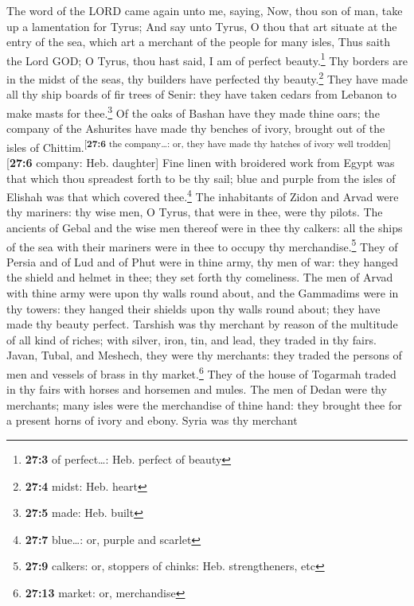 The word of the LORD came again unto me, saying,
 Now, thou son of man, take up a lamentation for Tyrus;
 And say unto Tyrus, O thou that art situate at the entry
of the sea, which art a merchant of the people for many isles, Thus
saith the Lord GOD; O Tyrus, thou hast said, I am of perfect
beauty.\footnote{\textbf{27:3} of perfect\ldots: Heb. perfect of beauty}
 Thy borders are in the midst of the seas, thy builders
have perfected thy beauty.\footnote{\textbf{27:4} midst: Heb. heart}
 They have made all thy ship boards of fir trees of Senir:
they have taken cedars from Lebanon to make masts for thee.\footnote{\textbf{27:5}
  made: Heb. built}  Of the oaks of Bashan have they made
thine oars; the company of the Ashurites have made thy benches of ivory,
brought out of the isles of Chittim.\textsuperscript{{[}\textbf{27:6}
the company\ldots: or, they have made thy hatches of ivory well
trodden{]}}{[}\textbf{27:6} company: Heb. daughter{]} 
Fine linen with broidered work from Egypt was that which thou spreadest
forth to be thy sail; blue and purple from the isles of Elishah was that
which covered thee.\footnote{\textbf{27:7} blue\ldots: or, purple and
  scarlet}  The inhabitants of Zidon and Arvad were thy
mariners: thy wise men, O Tyrus, that were in thee, were thy pilots.
 The ancients of Gebal and the wise men thereof were in
thee thy calkers: all the ships of the sea with their mariners were in
thee to occupy thy merchandise.\footnote{\textbf{27:9} calkers: or,
  stoppers of chinks: Heb. strengtheners, etc}  They of
Persia and of Lud and of Phut were in thine army, thy men of war: they
hanged the shield and helmet in thee; they set forth thy comeliness.
 The men of Arvad with thine army were upon thy walls
round about, and the Gammadims were in thy towers: they hanged their
shields upon thy walls round about; they have made thy beauty perfect.
 Tarshish was thy merchant by reason of the multitude of
all kind of riches; with silver, iron, tin, and lead, they traded in thy
fairs.  Javan, Tubal, and Meshech, they were thy
merchants: they traded the persons of men and vessels of brass in thy
market.\footnote{\textbf{27:13} market: or, merchandise} 
They of the house of Togarmah traded in thy fairs with horses and
horsemen and mules.  The men of Dedan were thy merchants;
many isles were the merchandise of thine hand: they brought thee for a
present horns of ivory and ebony.  Syria was thy merchant
